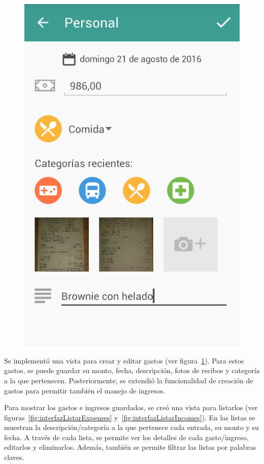 \begin{figure}[ht]
\begin{minipage}{.5\textwidth}
  \includegraphics[scale=0.4,type=png,ext=.png,read=.png]{imagenes/create_entry}
  \captionsetup{justification=centering}
  \label{fig:interfazCrearEntry}
\end{minipage}
\end{figure}

Se implementó una vista para crear y editar gastos (ver figura~\ref{fig:interfazCrearEntry}). Para estos gastos, se puede guardar su monto, fecha, descripción, fotos de recibos y categoría a la que pertenecen. Posteriormente, se extendió la funcionalidad de creación de gastos para permitir también el manejo de ingresos. 

Para mostrar los gastos e ingresos guardados, se creó una vista para listarlos (ver figuras~\ref{fig:interfazListarExpenses} y~\ref{fig:interfazListarIncomes}). En las listas se muestran la descripción/categoría a la que pertenece cada entrada, su monto y su fecha. A través de cada lista, se permite ver los detalles de cada gasto/ingreso, editarlos y eliminarlos. Además, también se permite filtrar las listas por palabras claves. 


